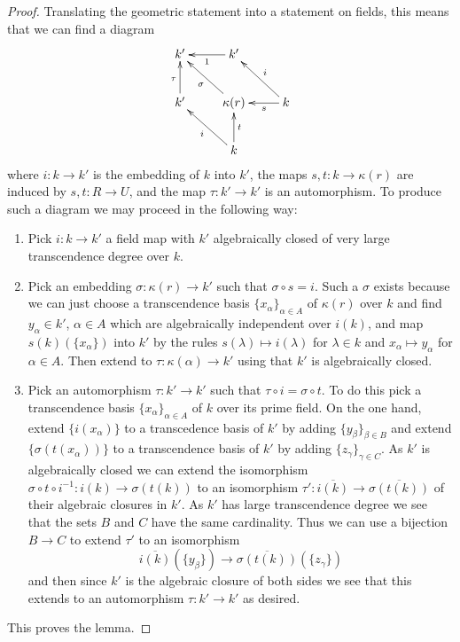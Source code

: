\begin{proof}
Translating the geometric statement into a statement on fields,
this means that we can find a diagram
$$
\xymatrix{
k' & k' \ar[l]^1 & \\
k' \ar[u]^\tau & \kappa(r) \ar[lu]^\sigma & k \ar[l]^-s \ar[lu]_i \\
& k \ar[lu]^i \ar[u]_t
}
$$
where $i : k \to k'$ is the embedding of $k$ into $k'$,
the maps $s, t : k \to \kappa(r)$ are induced by $s, t : R \to U$, and
the map $\tau : k' \to k'$ is an automorphism. To produce such
a diagram we may proceed in the following way:
\begin{enumerate}
\item Pick $i : k \to k'$ a field map with $k'$ algebraically closed of
very large transcendence degree over $k$.
\item Pick an embedding $\sigma : \kappa(r) \to k'$ such that
$\sigma \circ s = i$. Such a $\sigma$ exists because we can just
choose a transcendence basis $\{x_\alpha\}_{\alpha \in A}$ of $\kappa(r)$
over $k$ and find $y_\alpha \in k'$, $\alpha \in A$ which are algebraically
independent over $i(k)$, and map $s(k)(\{x_\alpha\})$ into $k'$ by
the rules $s(\lambda) \mapsto i(\lambda)$ for $\lambda \in k$
and $x_\alpha \mapsto y_\alpha$ for $\alpha \in A$.
Then extend to $\tau : \kappa(\alpha) \to k'$ using that $k'$ is
algebraically closed.
\item Pick an automorphism $\tau : k' \to k'$ such that
$\tau \circ i = \sigma \circ t$. To do this pick a transcendence
basis $\{x_\alpha\}_{\alpha \in A}$ of $k$ over its prime field.
On the one hand, extend $\{i(x_\alpha)\}$ to a transcedence basis of
$k'$ by adding $\{y_\beta\}_{\beta \in B}$ and extend
$\{\sigma(t(x_\alpha))\}$ to a transcendence basis of $k'$ by adding
$\{z_\gamma\}_{\gamma \in C}$.
As $k'$ is algebraically closed we can extend the isomorphism
$\sigma \circ t \circ i^{-1} : i(k) \to \sigma(t(k))$
to an isomorphism $\tau' : \overline{i(k)} \to \overline{\sigma(t(k))}$
of their algebraic closures in $k'$. 
As $k'$ has large transcendence degree
we see that the sets $B$ and $C$ have the same cardinality.
Thus we can use a bijection
$B \to C$ to extend $\tau'$ to an isomorphism
$$
\overline{i(k)}(\{y_\beta\})
\longrightarrow
\overline{\sigma(t(k))}(\{z_\gamma\})
$$
and then since $k'$ is the algebraic closure of both sides we
see that this extends to an automorphism $\tau : k' \to k'$
as desired.
\end{enumerate}
This proves the lemma.
\end{proof}

